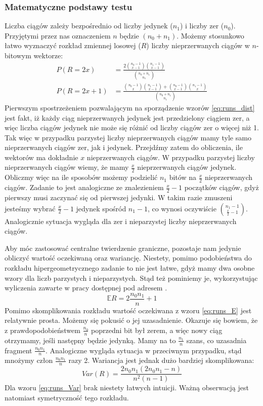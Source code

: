 \subsubsection{Matematyczne podstawy testu}
Liczba ciągów zależy bezpośrednio od liczby jedynek ($n_1$) i liczby zer ($n_0$). Przyjętymi przez nas oznaczeniem $n$ będzie $(n_0+n_1)$. Możemy stosunkowo łatwo wyznaczyć rozkład zmiennej losowej ($R$) liczby nieprzerwanych ciągów w $n$-bitowym wektorze:
\begin{equation}
\label{eq:runs_dist}
\begin{split}
    P(R = 2x) &= \frac{2\binom{n_0-1}{x-1}\binom{n_1-1}{x-1}}{\binom{n_0+n_1}{n_1}}\\
    P(R = 2x + 1) &= \frac{\binom{n_0-1}{x}\binom{n_1-1}{x-1} + \binom{n_0-1}{x-1}\binom{n_1-1}{x}}{\binom{n_0+n_1}{n_1}}
\end{split}
\end{equation}
Pierwszym spostrzeżeniem pozwalającym na sporządzenie wzorów \ref{eq:runs_dist} jest fakt, iż każdy ciąg nieprzerwanych jedynek jest przedzielony ciągiem zer, a więc liczba ciągów jedynek nie może się różnić od liczby ciągów zer o więcej niż 1. Tak więc w przypadku parzystej liczby nieprzerwanych ciągów mamy tyle samo nieprzerwanych ciągów zer, jak i jedynek. Przejdźmy zatem do obliczenia, ile wektorów ma dokładnie $x$ nieprzerwanych ciągów. W przypadku parzystej liczby nieprzerwanych ciągów wiemy, że mamy $\frac{x}{2}$ nieprzerwanych ciągów jedynek. Obliczmy więc na ile sposobów możemy podzielić $n_1$ bitów na $\frac{x}{2}$ nieprzerwanych ciągów. Zadanie to jest analogiczne ze znalezieniem $\frac{x}{2} - 1$ początków ciągów, gdyż pierwszy musi zaczynać się od pierwszej jedynki. W takim razie zmuszeni jesteśmy wybrać $\frac{x}{2} - 1$ jedynek spośród $n_1 - 1$, co wynosi oczywiście $\binom{n_1-1}{\frac{x}{2}-1}$. Analogicznie sytuacja wygląda dla zer i nieparzystej liczby nieprzerwanych ciągów.\par
Aby móc zastosować centralne twierdzenie graniczne, pozostaje nam jedynie obliczyć wartość oczekiwaną oraz wariancję. Niestety, pomimo podobieństwa do rozkładu hipergeometrycznego zadanie to nie jest łatwe, gdyż mamy dwa osobne wzory dla liczb parzystych i nieparzystych. Stąd też pominiemy je, wykorzystując wyliczenia zawarte w pracy dostępnej pod adresem \cite{Runs}.
\begin{equation}
\label{eq:runs_E}
    \mathbb{E}R = 2\frac{n_0n_1}{n} + 1
\end{equation}
Pomimo skomplikowania rozkładu wartość oczekiwana z wzoru \ref{eq:runs_E} jest relatywnie prosta. Możemy się pokusić o jej uzasadnienie. Okazuje się bowiem, że z prawdopodobieństwem $\frac{n_0}{n}$ poprzedni bit był zerem, a więc nowy ciąg otrzymamy, jeśli następny będzie jedynką. Mamy na to $\frac{n_1}{n}$ szans, co uzasadnia fragment $\frac{n_0n_1}{n}$. Analogiczne wygląda sytuacja w przeciwnym przypadku, stąd mnożymy człon $\frac{n_0n_1}{n}$ razy 2. Wariancja jest jednak dużo bardziej skomplikowana:
\begin{equation}
\label{eq:runs_Var}
    Var(R) = \frac{2n_0n_1(2n_0n_1 - n)}{n^2(n-1)}
\end{equation}
Dla wzoru \ref{eq:runs_Var} brak niestety łatwych intuicji. Ważną obserwacją jest natomiast symetryczność tego rozkładu.
